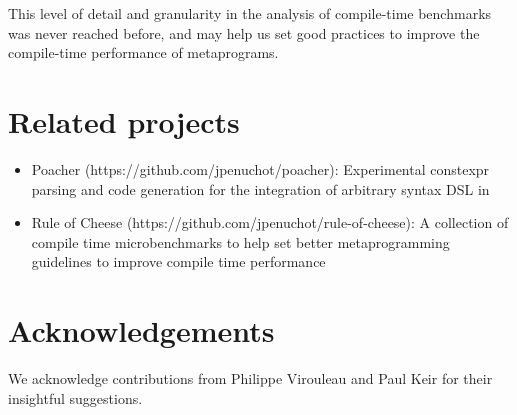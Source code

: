 \documentclass[../../main.tex]{subfiles}
\begin{document}
This level of detail and granularity in the analysis of compile-time benchmarks
was never reached before, and may help us set good practices to improve the
compile-time performance of metaprograms.

\section{Related projects} %

\begin{itemize}

\item Poacher (https://github.com/jpenuchot/poacher): Experimental constexpr
      parsing and code generation for the integration of arbitrary syntax DSL in

\item Rule of Cheese (https://github.com/jpenuchot/rule-of-cheese):
      A collection of compile time microbenchmarks to help set better
      \cpp metaprogramming guidelines to improve compile time performance
\end{itemize}

\section{Acknowledgements}

We acknowledge contributions from Philippe Virouleau and Paul Keir for their
insightful suggestions.
\end{document}
